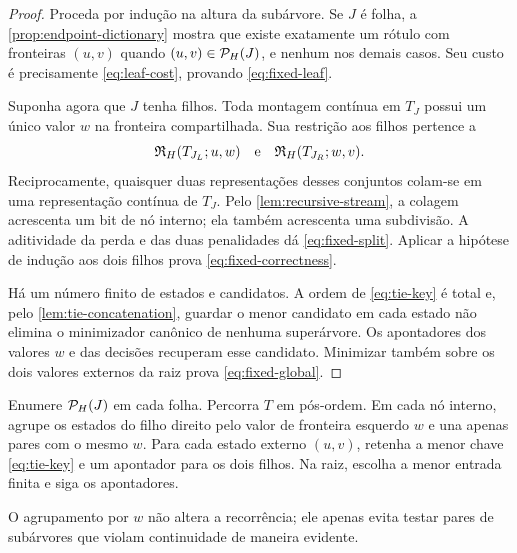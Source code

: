 \begin{proof}
Proceda por indução na altura da subárvore. Se $J$ é folha, a
\cref{prop:endpoint-dictionary} mostra que existe exatamente um rótulo com
fronteiras $(u,v)$ quando $(u,v)\in\mathcal{P}_H(J)$, e nenhum nos demais casos.
Seu custo é precisamente \eqref{eq:leaf-cost}, provando
\eqref{eq:fixed-leaf}.

Suponha agora que $J$ tenha filhos. Toda montagem contínua em $T_J$ possui um
único valor $w$ na fronteira compartilhada. Sua restrição aos filhos pertence
a
\[
 \mathfrak{R}_H(T_{J_L};u,w)
 \quad\text{e}\quad
 \mathfrak{R}_H(T_{J_R};w,v).
\]
Reciprocamente, quaisquer duas representações desses conjuntos colam-se em
uma representação contínua de $T_J$. Pelo \cref{lem:recursive-stream}, a
colagem acrescenta um bit de nó interno; ela também acrescenta uma
subdivisão. A aditividade da perda e das duas penalidades dá
\eqref{eq:fixed-split}. Aplicar a hipótese de indução aos dois filhos prova
\eqref{eq:fixed-correctness}.

Há um número finito de estados e candidatos. A ordem de
\eqref{eq:tie-key} é total e, pelo \cref{lem:tie-concatenation}, guardar o
menor candidato em cada estado não elimina o minimizador canônico de nenhuma
superárvore. Os apontadores dos valores $w$ e das decisões recuperam esse
candidato. Minimizar também sobre os dois valores externos da raiz prova
\eqref{eq:fixed-global}.
\end{proof}

\begin{algorithm}
\label{alg:fixed-tree}
Enumere $\mathcal{P}_H(J)$ em cada folha. Percorra $T$ em pós-ordem. Em cada nó
interno, agrupe os estados do filho direito pelo valor de fronteira esquerdo
$w$ e una apenas pares com o mesmo $w$. Para cada estado externo $(u,v)$,
retenha a menor chave \eqref{eq:tie-key} e um apontador para os dois filhos.
Na raiz, escolha a menor entrada finita e siga os apontadores.
\end{algorithm}

O agrupamento por $w$ não altera a recorrência; ele apenas evita testar pares
de subárvores que violam continuidade de maneira evidente.
